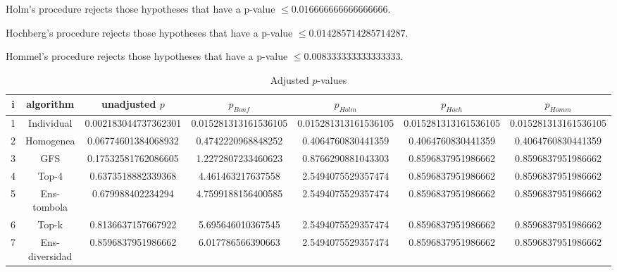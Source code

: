 \documentclass[a4paper,10pt]{article}
\begin{document}
\begin{landscape}
Holm's procedure rejects those hypotheses that have a p-value $\le0.016666666666666666$.


Hochberg's procedure rejects those hypotheses that have a p-value $\le0.014285714285714287$.


Hommel's procedure rejects those hypotheses that have a p-value $\le0.008333333333333333$.


\begin{table}[!htp]
\centering\tiny
\caption{Adjusted $p$-values}
\begin{tabular}{ccccccc}
i&algorithm&unadjusted $p$&$p_{Bonf}$&$p_{Holm}$&$p_{Hoch}$&$p_{Homm}$\\
\hline
1&Individual&0.002183044737362301&0.015281313161536105&0.015281313161536105&0.015281313161536105&0.015281313161536105\\
2&Homogenea&0.06774601384068932&0.4742220968848252&0.4064760830441359&0.4064760830441359&0.4064760830441359\\
3&GFS&0.17532581762086605&1.2272807233460623&0.8766290881043303&0.8596837951986662&0.8596837951986662\\
4&Top-4&0.6373518882339368&4.461463217637558&2.5494075529357474&0.8596837951986662&0.8596837951986662\\
5&Ens-tombola&0.679988402234294&4.7599188156400585&2.5494075529357474&0.8596837951986662&0.8596837951986662\\
6&Top-k&0.8136637157667922&5.695646010367545&2.5494075529357474&0.8596837951986662&0.8596837951986662\\
7&Ens-diversidad&0.8596837951986662&6.017786566390663&2.5494075529357474&0.8596837951986662&0.8596837951986662\\
\hline
\end{tabular}
\end{table}


\end{landscape}
\end{document}
